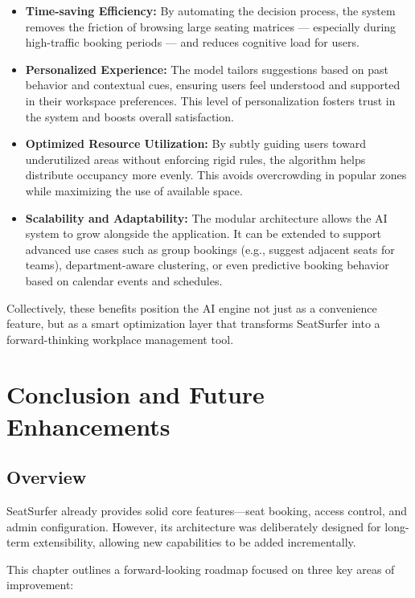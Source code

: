 \documentclass[12pt,a4paper]{report} %
\begin{document}
\begin{itemize}
\item \textbf{Time-saving Efficiency:}
By automating the decision process, the system removes the friction of browsing large seating matrices — especially during high-traffic booking periods — and reduces cognitive load for users.
\item \textbf{Personalized Experience:}  
The model tailors suggestions based on past behavior and contextual cues, ensuring users feel understood and supported in their workspace preferences. This level of personalization fosters trust in the system and boosts overall satisfaction.
\item \textbf{Optimized Resource Utilization:}  
By subtly guiding users toward underutilized areas without enforcing rigid rules, the algorithm helps distribute occupancy more evenly. This avoids overcrowding in popular zones while maximizing the use of available space.
\item \textbf{Scalability and Adaptability:}  
The modular architecture allows the AI system to grow alongside the application. It can be extended to support advanced use cases such as group bookings (e.g., suggest adjacent seats for teams), department-aware clustering, or even predictive booking behavior based on calendar events and schedules.
\end{itemize}

Collectively, these benefits position the AI engine not just as a convenience feature, but as a smart optimization layer that transforms SeatSurfer into a forward-thinking workplace management tool.

\newpage

\chapter{Conclusion and Future Enhancements}

\section{Overview}

SeatSurfer already provides solid core features—seat booking, access control, and admin configuration. However, its architecture was deliberately designed for long-term extensibility, allowing new capabilities to be added incrementally.

This chapter outlines a forward-looking roadmap focused on three key areas of improvement:
\end{document}
